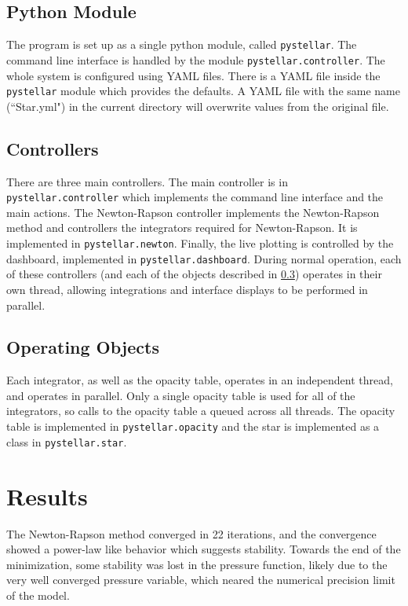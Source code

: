 \documentclass[10pt]{article}
\begin{document}
\subsection{Python Module}
The program is set up as a single python module, called \lstinline{pystellar}. The command line interface is handled by the module \lstinline{pystellar.controller}. The whole system is configured using YAML files. There is a YAML file inside the \lstinline{pystellar} module which provides the defaults. A YAML file with the same name (``Star.yml") in the current directory will overwrite values from the original file.

\subsection{Controllers}
There are three main controllers. The main controller is in \lstinline{pystellar.controller} which implements the command line interface and the main actions. The Newton-Rapson controller implements the Newton-Rapson method and controllers the integrators required for Newton-Rapson. It is implemented in \lstinline{pystellar.newton}. Finally, the live plotting is controlled by the dashboard, implemented in \lstinline{pystellar.dashboard}. During normal operation, each of these controllers (and each of the objects described in \cref{sec:objects}) operates in their own thread, allowing integrations and interface displays to be performed in parallel.

\subsection{Operating Objects} \label{sec:objects}
Each integrator, as well as the opacity table, operates in an independent thread, and operates in parallel. Only a single opacity table is used for all of the integrators, so calls to the opacity table a queued across all threads. The opacity table is implemented in \lstinline{pystellar.opacity} and the star is implemented as a class in \lstinline{pystellar.star}.

\section{Results} \label{sec:results}
The Newton-Rapson method converged in 22 iterations, and the convergence showed a power-law like behavior which suggests stability. Towards the end of the minimization, some stability was lost in the pressure function, likely due to the very well converged pressure variable, which neared the numerical precision limit of the model.
\end{document}
